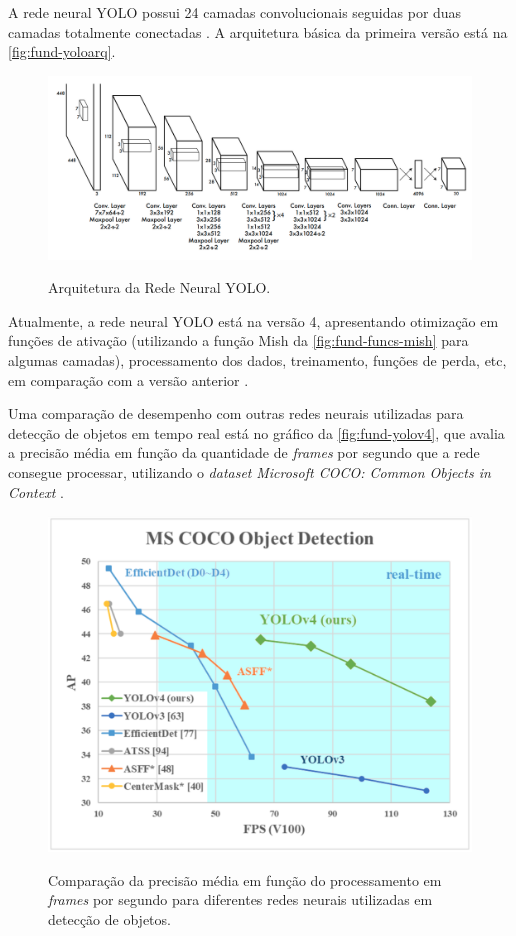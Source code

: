 A rede neural YOLO possui 24 camadas convolucionais seguidas por duas camadas totalmente conectadas \cite{ref:Yan}. A arquitetura básica da primeira versão está na \autoref{fig:fund-yoloarq}.

\begin{figure}[h!] %
  \centering
  \caption{Arquitetura da Rede Neural YOLO.}
  \includegraphics[scale=0.3]{img/img-fundamentacao-yoloarq.png}
  \label{fig:fund-yoloarq}
\end{figure}

Atualmente, a rede neural YOLO está na versão 4, apresentando otimização em funções de ativação (utilizando a função Mish da \autoref{fig:fund-funcs-mish} para algumas camadas), processamento dos dados, treinamento, funções de perda, etc, em comparação com a versão anterior \cite{ref:Wang-et-al}. 

Uma comparação de desempenho com outras redes neurais utilizadas para detecção de objetos em tempo real está no gráfico da \autoref{fig:fund-yolov4}, que avalia a precisão média em função da quantidade de \textit{frames} por segundo que a rede consegue processar, utilizando o \textit{dataset} \textit{Microsoft COCO:  Common Objects in Context} \cite{ref:Lin-et-al}.

\begin{figure}[h!] %
  \centering
  \caption{Comparação da precisão média em função do processamento em \textit{frames} por segundo para diferentes redes neurais utilizadas em detecção de objetos.}
  \includegraphics[scale=0.3]{img/img-fundamentacao-yolov4.png}
  \label{fig:fund-yolov4}
\end{figure}

